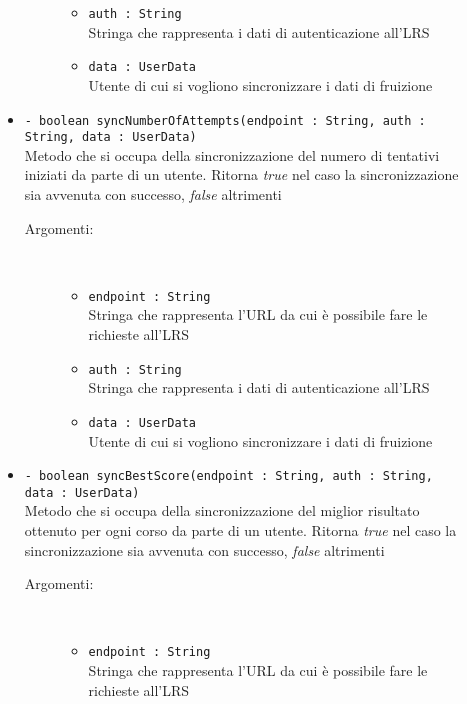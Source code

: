 \documentclass[../Tesi.tex]{subfiles}
\begin{document}
\begin{description}
\begin{itemize}
\begin{description}
\begin{itemize}
						\item \texttt{auth : String}\\
						Stringa che rappresenta i dati di autenticazione all'LRS

						\item \texttt{data : UserData}\\
						Utente di cui si vogliono sincronizzare i dati di fruizione
					\end{itemize}
				\end{description}

				\item \texttt{- boolean syncNumberOfAttempts(endpoint : String, auth : String, data : UserData)}\\
				Metodo che si occupa della sincronizzazione del numero di tentativi iniziati da parte di un utente. Ritorna \textit{true} nel caso la sincronizzazione sia avvenuta con successo, \textit{false} altrimenti
				\begin{description}
					\item[Argomenti:] \
					\begin{itemize}
						\item \texttt{endpoint : String}\\
						Stringa che rappresenta l'URL da cui è possibile fare le richieste all'LRS

						\item \texttt{auth : String}\\
						Stringa che rappresenta i dati di autenticazione all'LRS

						\item \texttt{data : UserData}\\
						Utente di cui si vogliono sincronizzare i dati di fruizione
					\end{itemize}
				\end{description}

				\item \texttt{- boolean syncBestScore(endpoint : String, auth : String, data : UserData)}\\
				Metodo che si occupa della sincronizzazione del miglior risultato ottenuto per ogni corso da parte di un utente. Ritorna \textit{true} nel caso la sincronizzazione sia avvenuta con successo, \textit{false} altrimenti
				\begin{description}
					\item[Argomenti:] \
					\begin{itemize}
						\item \texttt{endpoint : String}\\
						Stringa che rappresenta l'URL da cui è possibile fare le richieste all'LRS


\end{itemize}
\end{description}
\end{itemize}
\end{description}
\end{document}
